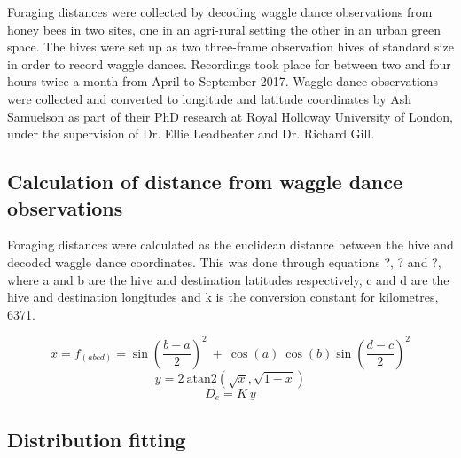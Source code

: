 \documentclass[11pt,usenames,dvipsnames,a4paper]{article}
\begin{document}
\begin{linenumbers}
\hspace{\parindent}
Foraging distances were collected by decoding waggle dance observations from honey bees in two sites, one in an agri-rural setting the other in an urban green space. The hives were set up as two three-frame observation hives of standard size in order to record waggle dances. Recordings took place for between two and four hours twice a month from April to September 2017. Waggle dance observations were collected and converted to longitude and latitude coordinates by Ash Samuelson as part of their PhD research at Royal Holloway University of London, under the supervision of Dr. Ellie Leadbeater and Dr. Richard Gill.
\end{linenumbers}

\subsection{Calculation of distance from waggle dance observations}

\begin{linenumbers}
\hspace{\parindent}
Foraging distances were calculated as the euclidean distance between the hive and decoded waggle dance coordinates. This was done through equations ?, ? and ?, where a and b are the hive and destination latitudes respectively, c and d are the hive and destination longitudes and k is the conversion constant for kilometres, 6371.
\end{linenumbers}
\begin{equation}
x = f_{(abcd)} = \sin\left(\frac{b - a}{2}\right)^2\ +\ \cos(a)\ \cos(b) \sin\left(\frac{d - c}{2}\right)^2 
\end{equation}
\begin{equation}
y = 2\ \text{atan2}(\sqrt{x}, \sqrt{1 - x})
\end{equation}
\begin{equation}
D_e = K\ y
\end{equation}

\subsection{Distribution fitting}
\end{document}
